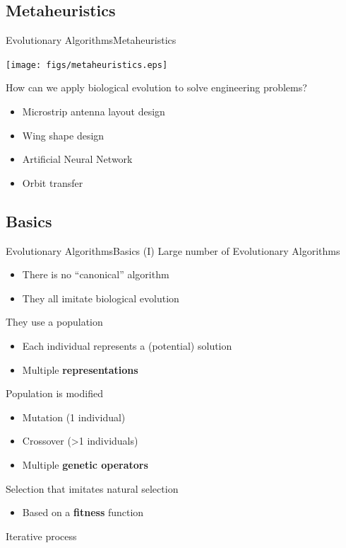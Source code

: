 \documentclass[10pt,compress]{beamer} %
\begin{document}
\subsection{Metaheuristics}
\begin{frame}[plain]{Evolutionary Algorithms}{Metaheuristics}
    \vspace{-0.5cm}
	\begin{center}
		\texttt{[image: figs/metaheuristics.eps]}
	\end{center}
\end{frame}

\begin{frame}[plain]{}
	How can we apply biological evolution to solve engineering problems?
    \begin{itemize}
    \item Microstrip antenna layout design
    \item Wing shape design
    \item Artificial Neural Network
    \item Orbit transfer
    \end{itemize}
\end{frame}

\subsection{Basics}
\begin{frame}{Evolutionary Algorithms}{Basics (I)} 
	Large number of Evolutionary Algorithms
	\begin{itemize}
		\item There is no ``canonical'' algorithm
		\item They all imitate biological evolution
	\end{itemize}
	They use a population
	\begin{itemize}
		\item Each individual represents a (potential) solution
		\item Multiple \textbf{representations}
	\end{itemize}
	Population is modified
	\begin{itemize}
		\item Mutation (1 individual)
		\item Crossover (>1 individuals)
		\item Multiple \textbf{genetic operators}
	\end{itemize}
	Selection that imitates natural selection
	\begin{itemize}
		\item Based on a \textbf{fitness} function
	\end{itemize}
	Iterative process
\end{frame}
\end{document}
